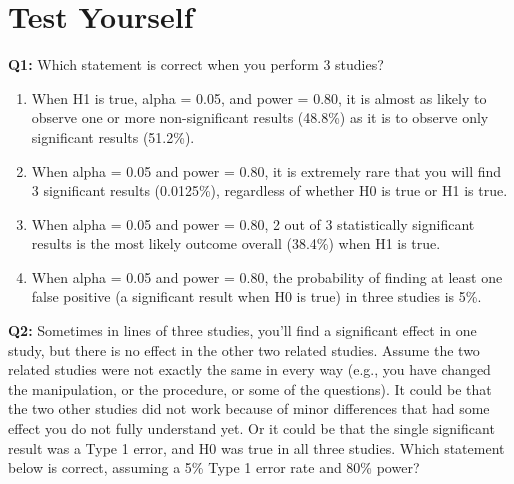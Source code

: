 \documentclass[
]{krantz}
\providecommand{\tightlist}{%
  \setlength{\itemsep}{0pt}\setlength{\parskip}{0pt}}
\begin{document}
\hypertarget{test-yourself-2}{%
\section{Test Yourself}\label{test-yourself-2}}

\textbf{Q1:} Which statement is correct when you perform 3 studies?

\begin{enumerate}
\def\labelenumi{\Alph{enumi})}
\tightlist
\item
  When H1 is true, alpha = 0.05, and power = 0.80, it is almost as likely to observe one or more non-significant results (48.8\%) as it is to observe only significant results (51.2\%).
\item
  When alpha = 0.05 and power = 0.80, it is extremely rare that you will find 3 significant results (0.0125\%), regardless of whether H0 is true or H1 is true.
\item
  When alpha = 0.05 and power = 0.80, 2 out of 3 statistically significant results is the most likely outcome overall (38.4\%) when H1 is true.
\item
  When alpha = 0.05 and power = 0.80, the probability of finding at least one false positive (a significant result when H0 is true) in three studies is 5\%.
\end{enumerate}

\textbf{Q2:} Sometimes in lines of three studies, you'll find a significant effect in one study, but there is no effect in the other two related studies. Assume the two related studies were not exactly the same in every way (e.g., you have changed the manipulation, or the procedure, or some of the questions). It could be that the two other studies did not work because of minor differences that had some effect you do not fully understand yet. Or it could be that the single significant result was a Type 1 error, and H0 was true in all three studies. Which statement below is correct, assuming a 5\% Type 1 error rate and 80\% power?
\end{document}
